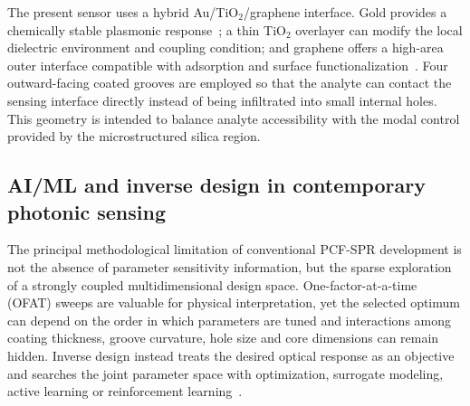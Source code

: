 \documentclass[5p,times,twocolumn]{elsarticle}
\begin{document}
The present sensor uses a hybrid Au/TiO$_2$/graphene interface. Gold provides a chemically stable plasmonic response~\cite{Johnson1972,Palik1998Optical}; a thin TiO$_2$ overlayer can modify the local dielectric environment and coupling condition; and graphene offers a high-area outer interface compatible with adsorption and surface functionalization~\cite{Lin2020TiO2,Dash2014Graphene,Szunerits2013Graphene,Tan2015GraphenePCF}. Four outward-facing coated grooves are employed so that the analyte can contact the sensing interface directly instead of being infiltrated into small internal holes. This geometry is intended to balance analyte accessibility with the modal control provided by the microstructured silica region.

\subsection{AI/ML and inverse design in contemporary photonic sensing}
\label{subsec:ml_literature}

The principal methodological limitation of conventional PCF-SPR development is not the absence of parameter sensitivity information, but the sparse exploration of a strongly coupled multidimensional design space. One-factor-at-a-time (OFAT) sweeps are valuable for physical interpretation, yet the selected optimum can depend on the order in which parameters are tuned and interactions among coating thickness, groove curvature, hole size and core dimensions can remain hidden. Inverse design instead treats the desired optical response as an objective and searches the joint parameter space with optimization, surrogate modeling, active learning or reinforcement learning~\cite{Molesky2018Inverse,Geddis2026AIPlasmonics}.
\end{document}
